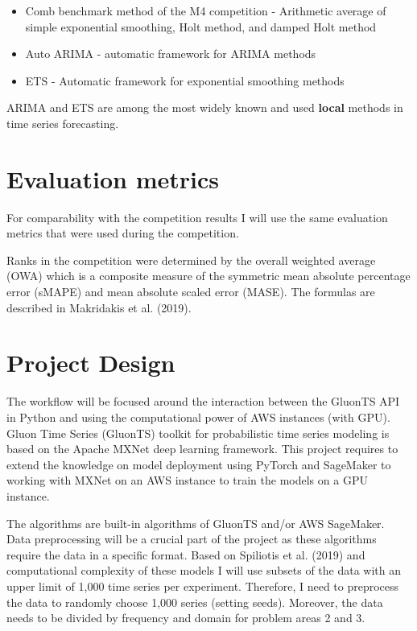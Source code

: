 \documentclass[11pt]{article}
\providecommand{\tightlist}{%
      \setlength{\itemsep}{0pt}\setlength{\parskip}{0pt}}
\begin{document}
\begin{itemize}
\tightlist
\item
  Comb benchmark method of the M4 competition - Arithmetic average of
  simple exponential smoothing, Holt method, and damped Holt method
\item
  Auto ARIMA - automatic framework for ARIMA methods
\item
  ETS - Automatic framework for exponential smoothing methods
\end{itemize}

ARIMA and ETS are among the most widely known and used \textbf{local}
methods in time series forecasting.

    \hypertarget{evaluation-metrics}{%
\section{Evaluation metrics}\label{evaluation-metrics}}

For comparability with the competition results I will use the same
evaluation metrics that were used during the competition.

Ranks in the competition were determined by the overall weighted average
(OWA) which is a composite measure of the symmetric mean absolute
percentage error (sMAPE) and mean absolute scaled error (MASE). The
formulas are described in Makridakis et al. (2019).

    \hypertarget{project-design}{%
\section{Project Design}\label{project-design}}

The workflow will be focused around the interaction between the GluonTS
API in Python and using the computational power of AWS instances (with
GPU). Gluon Time Series (GluonTS) toolkit for probabilistic time series
modeling is based on the Apache MXNet deep learning framework. This
project requires to extend the knowledge on model deployment using
PyTorch and SageMaker to working with MXNet on an AWS instance to train
the models on a GPU instance.

The algorithms are built-in algorithms of GluonTS and/or AWS SageMaker.
Data preprocessing will be a crucial part of the project as these
algorithms require the data in a specific format. Based on Spiliotis et
al. (2019) and computational complexity of these models I will use
subsets of the data with an upper limit of 1,000 time series per
experiment. Therefore, I need to preprocess the data to randomly choose
1,000 series (setting seeds). Moreover, the data needs to be divided by
frequency and domain for problem areas 2 and 3.
\end{document}
